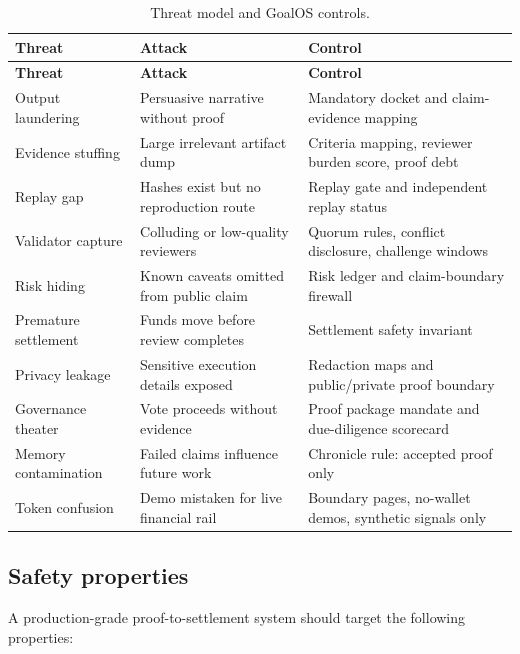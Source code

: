 \documentclass[11pt]{article}
\begin{document}
\begin{longtable}{p{} p{} p{}}
\caption{Threat model and GoalOS controls.}\label{tab:threats}\\
\toprule
\textbf{Threat} & \textbf{Attack} & \textbf{Control}\\
\midrule
\endfirsthead
\toprule
\textbf{Threat} & \textbf{Attack} & \textbf{Control}\\
\midrule
\endhead
Output laundering & Persuasive narrative without proof & Mandatory docket and claim-evidence mapping \\
Evidence stuffing & Large irrelevant artifact dump & Criteria mapping, reviewer burden score, proof debt \\
Replay gap & Hashes exist but no reproduction route & Replay gate and independent replay status \\
Validator capture & Colluding or low-quality reviewers & Quorum rules, conflict disclosure, challenge windows \\
Risk hiding & Known caveats omitted from public claim & Risk ledger and claim-boundary firewall \\
Premature settlement & Funds move before review completes & Settlement safety invariant \\
Privacy leakage & Sensitive execution details exposed & Redaction maps and public/private proof boundary \\
Governance theater & Vote proceeds without evidence & Proof package mandate and due-diligence scorecard \\
Memory contamination & Failed claims influence future work & Chronicle rule: accepted proof only \\
Token confusion & Demo mistaken for live financial rail & Boundary pages, no-wallet demos, synthetic signals only \\
\bottomrule
\end{longtable}

\subsection{Safety properties}

A production-grade proof-to-settlement system should target the following properties:
\end{document}
